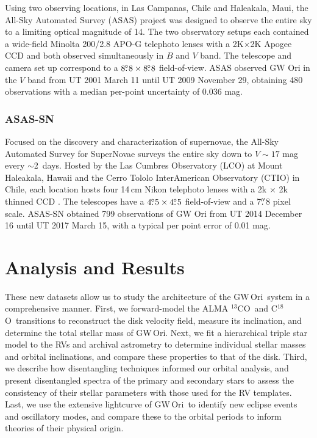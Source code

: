 \documentclass[twocolumn]{aastex61}
\newcommand{\obj}{GW\,Ori}
\newcommand{\thirteen}{${}^{13}$CO}
\newcommand{\eighteen}{C${}^{18}$O}
\begin{document}
Using two observing locations, in Las Campanas, Chile and Haleakala, Maui, the All-Sky Automated Survey (ASAS) project was designed to observe the entire sky to a limiting optical magnitude of 14. The two observatory setups each contained a wide-field Minolta 200/2.8 APO-G telephoto lenses with a 2K$\times$2K Apogee CCD and both observed simultaneously in $B$ and $V$ band. The telescope and camera set up correspond to a $8\mbox{$.\!\!^\circ$}8\times8\mbox{$.\!\!^\circ$}8$ field-of-view. ASAS observed GW Ori in the $V$ band from UT 2001 March 11 until UT 2009 November 29, obtaining 480 observations with a median per-point uncertainty of 0.036 mag.


\subsubsection{ASAS-SN}

Focused on the discovery and characterization of supernovae, the All-Sky Automated Survey for SuperNovae \citep[ASAS-SN;][]{Shappee14, kochanek17} surveys the entire sky down to $V \sim 17$ mag every \mbox{$\sim$2 days}. Hosted by the Las Cumbres Observatory (LCO) at Mount Haleakala, Hawaii and the Cerro Tololo InterAmerican Observatory (CTIO) in Chile, each location hosts four 14\,cm Nikon telephoto lenses with a 2k $\times$ 2k thinned CCD \citep{Brown13}. The telescopes have a $4\mbox{$.\!\!^\circ$}5\times4\mbox{$.\!\!^\circ$}5$ field-of-view and a 7$\mbox{$.\!\!^{\prime\prime}$}$8 pixel scale. ASAS-SN obtained 799 observations of GW Ori from UT 2014 December 16 until UT 2017 March 15, with a typical per point error of 0.01 mag.




\section{Analysis and Results \label{sec:analysis}}

These new datasets allow us to study the architecture of the \obj\ system in a comprehensive manner. First, we forward-model the ALMA \thirteen\ and \eighteen\ transitions to reconstruct the disk velocity field, measure its inclination, and determine the total stellar mass of \obj. Next, we fit a hierarchical triple star model to the RVs and archival astrometry to determine individual stellar masses and orbital inclinations, and compare these properties to that of the disk. Third, we describe how disentangling techniques informed our orbital analysis, and present disentangled spectra of the primary and secondary stars to assess the consistency of their stellar parameters with those used for the RV templates. Last, we use the extensive lightcurve of \obj\ to identify new eclipse events and oscillatory modes, and compare these to the orbital periods to inform theories of their physical origin.
\end{document}
